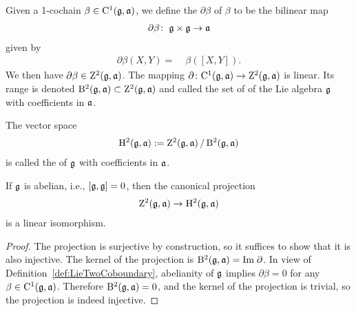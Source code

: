 \begin{definition}
  \label{def:LieTwoCoboundary}
  \leanok
  Given a 1-cochain $\beta \in \mathrm{C}^1(\mathfrak{g}, \mathfrak{a})$, we define the
   $\partial \beta$ of $\beta$ to be the bilinear map
  \begin{align*}
    \partial \beta \colon \; & \mathfrak{g} \times \mathfrak{g} \to \mathfrak{a} \\
  \end{align*}
  given by
  \begin{align*}
    \partial \beta (X, Y) = \; & \beta ([X,Y]) .
  \end{align*}
  We then have $\partial \beta \in \mathrm{Z}^2(\mathfrak{g},\mathfrak{a})$.
  The mapping $\partial \colon \mathrm{C}^1(\mathfrak{g},\mathfrak{a}) \to \mathrm{Z}^2(\mathfrak{g},\mathfrak{a})$
  is linear. Its range is denoted $\mathrm{B}^2(\mathfrak{g},\mathfrak{a}) \subset \mathrm{Z}^2(\mathfrak{g},\mathfrak{a})$
  and called the set of  of the Lie algebra $\mathfrak{g}$
  with coefficients in $\mathfrak{a}$.
\end{definition}

\begin{definition}
  \label{def:LieTwoCohomology}
  \leanok
  The vector space
  \begin{align*}
    \mathrm{H}^2(\mathfrak{g},\mathfrak{a}) := \mathrm{Z}^2(\mathfrak{g},\mathfrak{a}) \, / \, \mathrm{B}^2(\mathfrak{g},\mathfrak{a})
  \end{align*}
  is called the  of $\mathfrak{g}$
  with coefficients in $\mathfrak{a}$.
\end{definition}

\begin{lemma}
  \label{lem:LieTwoCohomology_abelian}
  \leanok
  If $\mathfrak{g}$ is abelian, i.e., $[\mathfrak{g},\mathfrak{g}] = 0$, then
  the canonical projection
  \begin{align*}
    \mathrm{Z}^2(\mathfrak{g},\mathfrak{a}) \to \mathrm{H}^2(\mathfrak{g},\mathfrak{a})
  \end{align*}
  is a linear isomorphism.
\end{lemma}
\begin{proof}
  \leanok
  The projection is surjective by construction, so it suffices to show that it is also injective.
  The kernel of the projection is $\mathrm{B}^2(\mathfrak{g},\mathfrak{a}) = \mathrm{Im} \; \partial$.
  In view of Definition~\ref{def:LieTwoCoboundary},
  abelianity of $\mathfrak{g}$ implies $\partial \beta = 0$ for any $\beta \in \mathrm{C}^1(\mathfrak{g},\mathfrak{a})$.
  Therefore $\mathrm{B}^2(\mathfrak{g},\mathfrak{a}) = 0$, and the kernel of the projection is trivial,
  so the projection is indeed injective.
\end{proof}
